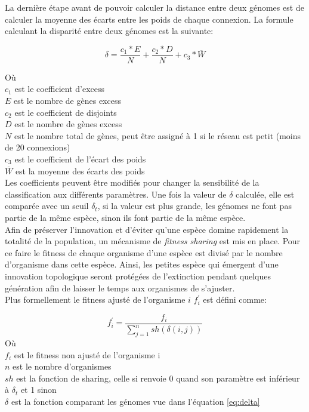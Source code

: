 \documentclass{article}
\begin{document}
La dernière étape avant de pouvoir calculer la distance entre deux génomes est de calculer la moyenne des écarts entre les poids de chaque connexion.
La formule calculant la disparité entre deux génomes est la suivante:

\begin{equation}
	\delta = \frac{c_1 * E}{N} + \frac{c_2 * D}{N} + c_3 * \overline{W}
\label{eq:delta}
\end{equation}

Où\\
$c_1$ est le coefficient d'excess\\
$E$ est le nombre de gènes excess\\
$c_2$ est le coefficient de disjoints\\
$D$ est le nombre de gènes excess\\
$N$ est le nombre total de gènes, peut être assigné à 1 si le réseau est petit (moins de 20 connexions)\\
$c_3$ est le coefficient de l'écart des poids\\
$\overline{W}$ est la moyenne des écarts des poids\\

Les coefficients peuvent être modifiés pour changer la sensibilité de la classification aux différents paramètres. Une fois la valeur de $\delta$ calculée, elle est comparée avec un seuil $\delta_t$, si la valeur est plus grande, les génomes ne font pas partie de la même espèce, sinon ils font partie de la même espèce.\\

Afin de préserver l'innovation et d'éviter qu'une espèce domine rapidement la totalité de la population, un mécanisme de \textit{fitness sharing} est mis en place. Pour ce faire le fitness de chaque organisme d'une espèce est divisé par le nombre d'organisme dans cette espèce. Ainsi, les petites espèce qui émergent d'une innovation topologique seront protégées de l'extinction pendant quelques génération afin de laisser le temps aux organismes de s'ajuster.\\

Plus formellement le fitness ajusté de l'organisme $i$ $f^\prime_i$ est défini comme:

\begin{equation}
	f^\prime_i = \frac{f_i}{\sum^n_{j=1} sh(\delta(i,j))}
\end{equation}
Où\\
$f_i$ est le fitness non ajusté de l'organisme i\\
$n$ est le nombre d'organismes\\
$sh$ est la fonction de sharing, celle si renvoie 0 quand son paramètre est inférieur à $\delta_t$ et 1 sinon\\
$\delta$ est la fonction comparant les génomes vue dans l'équation \ref{eq:delta}\\
\end{document}
